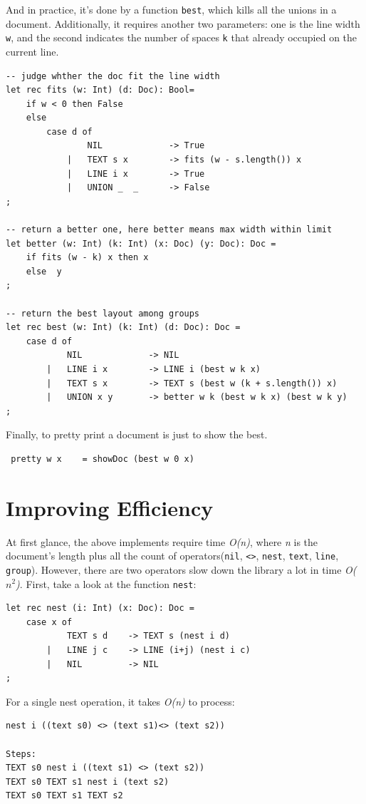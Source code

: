 And in practice, it's done by a function \texttt{best}, which kills all the unions in a document. Additionally, it requires another two parameters: one is the line width \texttt{w}, and the second indicates the number of spaces \texttt{k} that already occupied on the current line.
\begin{lstlisting}
-- judge whther the doc fit the line width
let rec fits (w: Int) (d: Doc): Bool=
    if w < 0 then False
    else
        case d of
                NIL             -> True
            |   TEXT s x        -> fits (w - s.length()) x
            |   LINE i x        -> True
            |   UNION _  _      -> False
;

-- return a better one, here better means max width within limit
let better (w: Int) (k: Int) (x: Doc) (y: Doc): Doc =
    if fits (w - k) x then x
    else  y
;

-- return the best layout among groups
let rec best (w: Int) (k: Int) (d: Doc): Doc =
    case d of
            NIL             -> NIL
        |   LINE i x        -> LINE i (best w k x)
        |   TEXT s x        -> TEXT s (best w (k + s.length()) x)
        |   UNION x y       -> better w k (best w k x) (best w k y)
;
\end{lstlisting}

Finally, to pretty print a document is just to show the best.
\begin{lstlisting}
 pretty w x    = showDoc (best w 0 x)
\end{lstlisting}

\section{Improving Efficiency}

At first glance, the above implements require time \textit{O(n)}, where \textit{n} is the document's length plus all the count of operators(\texttt{nil}, \texttt{<>}, \texttt{nest}, \texttt{text}, \texttt{line}, \texttt{group}). However, there are two operators slow down the library a lot in time \textit{O($n^2$)}. First, take a look at the function \texttt{nest}:
\begin{lstlisting}
let rec nest (i: Int) (x: Doc): Doc =
    case x of
            TEXT s d    -> TEXT s (nest i d)
        |   LINE j c    -> LINE (i+j) (nest i c)
        |   NIL         -> NIL
;
\end{lstlisting}

For a single nest operation, it takes \textit{O(n)} to process:
\begin{lstlisting}
nest i ((text s0) <> (text s1)<> (text s2))

Steps:
TEXT s0 nest i ((text s1) <> (text s2))
TEXT s0 TEXT s1 nest i (text s2)
TEXT s0 TEXT s1 TEXT s2
\end{lstlisting}

